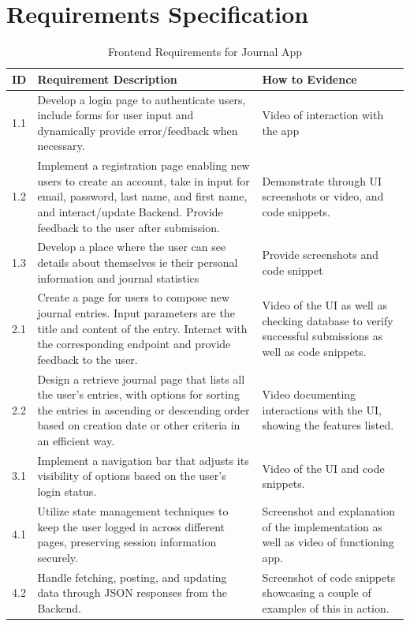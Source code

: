 \section{Requirements Specification}
\begin{table}[H]
\centering
\begin{tabular}{|l|p{8cm}|p{4cm}|}
\hline
\textbf{ID} & \textbf{Requirement Description} & \textbf{How to Evidence}\\ \hline
1.1 & Develop a login page to authenticate users, include forms for user input and dynamically provide error/feedback when necessary. & Video of interaction with the app\\ \hline

1.2 & Implement a registration page enabling new users to create an account, take in input for email, password, last name, and first name, and interact/update Backend. Provide feedback to the user after submission. & Demonstrate through UI screenshots or video, and code snippets.\\ \hline

1.3 & Develop a place where the user can see details about themselves ie their personal information and journal statistics & Provide screenshots and code snippet\\ \hline

2.1 & Create a page for users to compose new journal entries. Input parameters are the title and content of the entry. Interact with the corresponding endpoint and provide feedback to the user.& Video of the UI as well as checking database to verify successful submissions as well as code snippets.\\ \hline

2.2 & Design a retrieve journal page that lists all the user’s entries, with options for sorting the entries in ascending or descending order based on creation date or other criteria in an efficient way. & Video documenting interactions with the UI, showing the features listed.\\ \hline

3.1 & Implement a navigation bar that adjusts its visibility of options based on the user's login status. & Video of the UI and code snippets.\\ \hline

4.1 & Utilize state management techniques to keep the user logged in across different pages, preserving session information securely. & Screenshot and explanation of the implementation as well as video of functioning app.\\ \hline

4.2 & Handle fetching, posting, and updating data through JSON responses from the Backend. & Screenshot of code snippets showcasing a couple of examples of this in action. \\ \hline
\end{tabular}
\caption{Frontend Requirements for Journal App}
\end{table}


